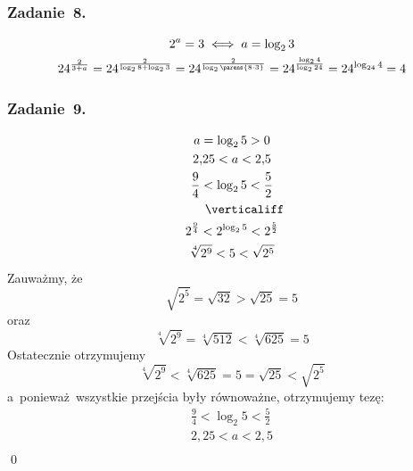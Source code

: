 \subsubsection*{Zadanie~8.}
\begin{gather*}
    2^a = 3 \iff a = \log_{2}{3}\\
    24^{\frac{2}{3 + a}} = 24^{\frac{2}{\log_{2}{8} + \log_{2}{3}}}
        = 24^{\frac{2}{\log_{2}{\parens{8 \cdot 3}}}}
        = 24^{\frac{\log_{2}{4}}{\log_{2}{24}}}
        = 24^{\log_{24}{4}}
        = 4
\end{gather*}
\subsubsection*{Zadanie~9.}
\begin{gather*}
    a = \log_{2}{5} > 0\\
    2{,}25 < a < 2{,}5\\
    \frac{9}{4} < \log_{2}{5} < \frac{5}{2}\\
    \qquad\verticaliff\\
    2^{\frac{9}{4}} < 2^{\log_{2}{5}} < 2^{\frac{5}{2}}\\
    \sqrt[4]{2^9} < 5 < \sqrt{2^5}
\end{gather*}
Zauważmy, że
\begin{equation*}
    \sqrt{2^5} = \sqrt{32} > \sqrt{25} = 5
\end{equation*}
oraz
\begin{equation*}
    \sqrt[4]{2^9} = \sqrt[4]{512} < \sqrt[4]{625} = 5
\end{equation*}
Ostatecznie otrzymujemy
\begin{equation*}
    \sqrt[4]{2^9} < \sqrt[4]{625} = 5 = \sqrt{25} < \sqrt{2^5}
\end{equation*}
a~ponieważ wszystkie przejścia były równoważne, otrzymujemy tezę:
\begin{gather*}
    \frac{9}{4} < \log_{2}{5} < \frac{5}{2}\\
    2{,}25 < a < 2{,}5\\
\end{gather*}
\qed

